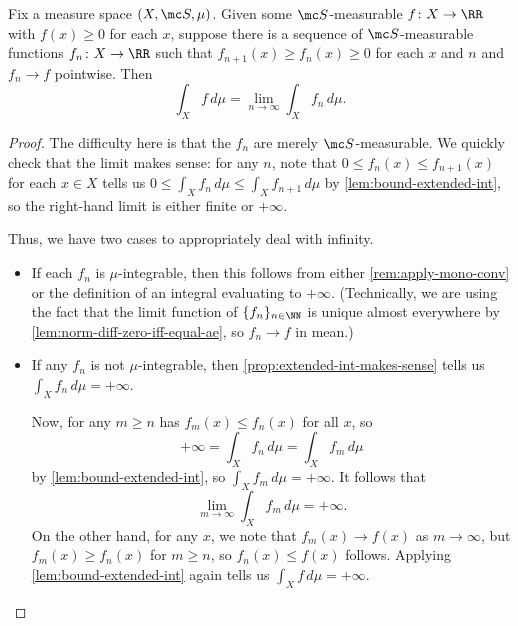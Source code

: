 \documentclass[../notes.tex]{subfiles}
\begin{document}
\begin{lemma} \label{lem:extended-mono-conv}
	Fix a measure space $(X,\mc S,\mu)$. Given some $\mc S$-measurable $f\colon X\to\RR$ with $f(x)\ge0$ for each $x$, suppose there is a sequence of $\mc S$-measurable functions $f_n\colon X\to\RR$ such that $f_{n+1}(x)\ge f_n(x)\ge0$ for each $x$ and $n$ and $f_n\to f$ pointwise. Then
	\[\int_Xf\,d\mu=\lim_{n\to\infty}\int_Xf_n\,d\mu.\]
\end{lemma}
\begin{proof}
	The difficulty here is that the $f_n$ are merely $\mc S$-measurable. We quickly check that the limit makes sense: for any $n$, note that $0\le f_n(x)\le f_{n+1}(x)$ for each $x\in X$ tells us $0\le\int_Xf_n\,d\mu\le\int_Xf_{n+1}\,d\mu$ by \autoref{lem:bound-extended-int}, so the right-hand limit is either finite or $+\infty$.
	
	Thus, we have two cases to appropriately deal with infinity.
	\begin{itemize}
		\item If each $f_n$ is $\mu$-integrable, then this follows from either \autoref{rem:apply-mono-conv} or the definition of an integral evaluating to $+\infty$. (Technically, we are using the fact that the limit function of $\{f_n\}_{n\in\NN}$ is unique almost everywhere by \autoref{lem:norm-diff-zero-iff-equal-ae}, so $f_n\to f$ in mean.)
		\item If any $f_n$ is not $\mu$-integrable, then \autoref{prop:extended-int-makes-sense} tells us $\int_Xf_n\,d\mu=+\infty$.
		
		Now, for any $m\ge n$ has $f_m(x)\le f_n(x)$ for all $x$, so
		\[+\infty=\int_Xf_n\,d\mu=\int_Xf_m\,d\mu\]
		by \autoref{lem:bound-extended-int}, so $\int_Xf_m\,d\mu=+\infty$. It follows that
		\[\lim_{m\to\infty}\int_Xf_m\,d\mu=+\infty.\]
		On the other hand, for any $x$, we note that $f_m(x)\to f(x)$ as $m\to\infty$, but $f_m(x)\ge f_n(x)$ for $m\ge n$, so $f_n(x)\le f(x)$ follows. Applying \autoref{lem:bound-extended-int} again tells us $\int_Xf\,d\mu=+\infty$.
		\qedhere
	\end{itemize}
\end{proof}
\end{document}
